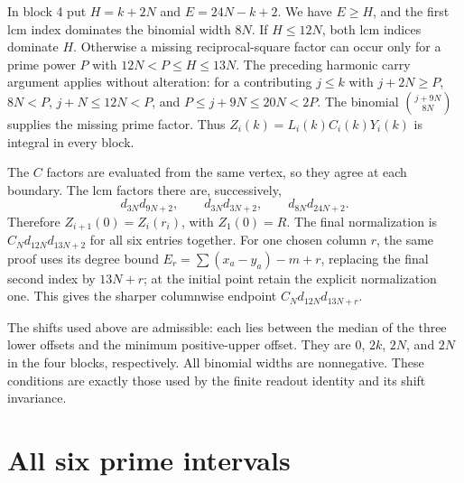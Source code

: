 \documentclass[11pt]{article}
\begin{document}
In block 4 put $H=k+2N$ and $E=24N-k+2$.
We have $E\ge H$, and the first lcm index dominates the binomial
width $8N$. If $H\le12N$, both lcm indices dominate $H$.
Otherwise a missing reciprocal-square factor can occur only for
a prime power $P$ with $12N<P\le H\le13N$.
The preceding harmonic carry argument applies without alteration:
for a contributing $j\le k$ with $j+2N\ge P$,
$8N<P$, $j+N\le12N<P$, and
$P\le j+9N\le20N<2P$.
The binomial $\binom{j+9N}{8N}$ supplies the missing prime factor.
Thus $Z_i(k)=L_i(k)C_i(k)Y_i(k)$ is integral in every block.

The $C$ factors are evaluated from the same vertex, so they agree
at each boundary. The lcm factors there are, successively,
\[
 d_{3N}d_{9N+2},\qquad d_{3N}d_{3N+2},\qquad
 d_{8N}d_{24N+2}.
\]
Therefore $Z_{i+1}(0)=Z_i(r_i)$, with $Z_1(0)=R$.
The final normalization is $C_Nd_{12N}d_{13N+2}$ for all six
entries together. For one chosen column $r$, the same proof uses
its degree bound $E_r=\sum(x_a-y_a)-m+r$, replacing the final
second index by $13N+r$; at the initial point retain the explicit
normalization one. This gives the sharper columnwise endpoint
$C_Nd_{12N}d_{13N+r}$.

The shifts used above are admissible: each lies between the median
of the three lower offsets and the minimum positive-upper offset.
They are $0$, $2k$, $2N$, and $2N$ in the four blocks, respectively.
All binomial widths are nonnegative. These conditions are exactly
those used by the finite readout identity and its shift invariance.


\section{All six prime intervals}\label{app:all-shells}
\end{document}
